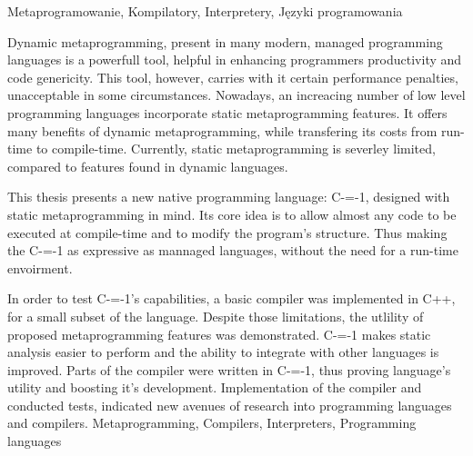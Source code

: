 \documentclass[
    left=2.5cm,         %
    right=2.5cm,        %
    top=2.5cm,          %
    bottom=3cm,         %
    bindingoffset=6mm,  %
    nohyphenation=false %
]{eiti/eiti-thesis}
\begin{document}
\slowakluczowe Metaprogramowanie, Kompilatory, Interpretery, Języki programowania

\newpage
\abstract 
Dynamic metaprogramming, present in many modern, managed programming languages is a powerfull tool, helpful in enhancing programmers productivity and code genericity.
This tool, however, carries with it certain performance penalties, unacceptable in some circumstances.
Nowadays, an increacing number of low level programming languages incorporate static metaprogramming features.
It offers many benefits of dynamic metaprogramming, while transfering its costs from run-time to compile-time.
Currently, static metaprogramming is severley limited, compared to features found in dynamic languages.

This thesis presents a new native programming language: C-=-1, designed with static metaprogramming in mind.
Its core idea is to allow almost any code to be executed at compile-time and to modify the program's structure.
Thus making the C-=-1 as expressive as mannaged languages, without the need for a run-time envoirment.

In order to test C-=-1's capabilities, a basic compiler was implemented in C++, for a small subset of the language.
Despite those limitations, the utlility of proposed metaprogramming features was demonstrated.
C-=-1 makes static analysis easier to perform and the ability to integrate with other languages is improved.
Parts of the compiler were written in C-=-1, thus proving language's utility and boosting it's development.
Implementation of the compiler and conducted tests, indicated new avenues of research into programming languages and compilers.
\keywords Metaprogramming, Compilers, Interpreters, Programming languages

\cleardoublepage  %
\pagestyle{plain}
\makeauthorship

\cleardoublepage %
\tableofcontents

\cleardoublepage %
\pagestyle{headings}


\newpage

\newpage

\newpage

\newpage

\newpage

\newpage

\newpage

\newpage

\end{document}
